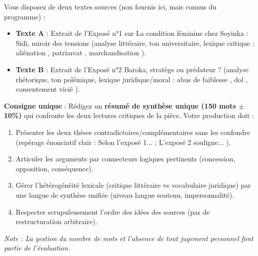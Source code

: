 \documentclass[11pt]{article}
\begin{document}
\begin{exercice}
Vous disposez de deux textes sources (non fournis ici, mais connus du programme) :
\begin{itemize}
    \item \textbf{Texte A} : Extrait de l'Exposé n°1 sur \og La condition féminine chez Soyinka : Sidi, miroir des tensions \fg{} (analyse littéraire, ton universitaire, lexique critique : \og aliénation \fg{}, \og patriarcat \fg{}, \og marchandisation \fg{}).
    \item \textbf{Texte B} : Extrait de l'Exposé n°2 \og Baroka, stratège ou prédateur ? \fg{} (analyse rhétorique, ton polémique, lexique juridique/moral : \og abus de faiblesse \fg{}, \og dol \fg{}, \og consentement vicié \fg{}).
\end{itemize}
\textbf{Consigne unique} : Rédigez un \textbf{résumé de synthèse unique (150 mots $\pm$ 10\%)} qui confronte les deux lectures critiques de la pièce. Votre production doit :
\begin{enumerate}
    \item Présenter les deux thèses contradictoires/complémentaires sans les confondre (repérage énonciatif clair : \og Selon l'exposé 1... ; L'exposé 2 souligne... \fg{}).
    \item Articuler les arguments par connecteurs logiques pertinents (concession, opposition, conséquence).
    \item Gérer l'hétérogénéité lexicale (critique littéraire vs vocabulaire juridique) par une langue de synthèse unifiée (niveau langue soutenu, impersonnalité).
    \item Respecter scrupuleusement l'ordre des idées des sources (pas de restructuration arbitraire).
\end{enumerate}
\textit{Note : La gestion du nombre de mots et l'absence de tout jugement personnel font partie de l'évaluation.}
\end{exercice}
\end{document}
